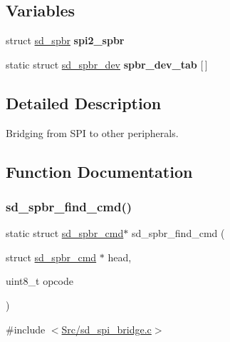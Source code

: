 \subsection*{Variables}
\begin{DoxyCompactItemize}
\item 
\mbox{\label{group___s_d___s_p_i___bridge_gae38f302a3033c610bf39100302e35677}} 
struct \mbox{\hyperlink{structsd__spbr}{sd\+\_\+spbr}} {\bfseries spi2\+\_\+spbr}
\item 
static struct \mbox{\hyperlink{structsd__spbr__dev}{sd\+\_\+spbr\+\_\+dev}} {\bfseries spbr\+\_\+dev\+\_\+tab} \mbox{[}$\,$\mbox{]}
\end{DoxyCompactItemize}


\subsection{Detailed Description}
Bridging from S\+PI to other peripherals. 



\subsection{Function Documentation}
\mbox{\label{group___s_d___s_p_i___bridge_ga2b5f70f500fea4bd4b79b8788ba6e03d}} 
\subsubsection{\texorpdfstring{sd\+\_\+spbr\+\_\+find\+\_\+cmd()}{sd\_spbr\_find\_cmd()}}
{\footnotesize\ttfamily static struct \mbox{\hyperlink{structsd__spbr__cmd}{sd\+\_\+spbr\+\_\+cmd}}$\ast$ sd\+\_\+spbr\+\_\+find\+\_\+cmd (\begin{DoxyParamCaption}\item[{struct \mbox{\hyperlink{structsd__spbr__cmd}{sd\+\_\+spbr\+\_\+cmd}} $\ast$}]{head,  }\item[{uint8\+\_\+t}]{opcode }\end{DoxyParamCaption})\hspace{0.3cm}{\ttfamily [static]}}



{\ttfamily \#include $<$\mbox{\hyperlink{sd__spi__bridge_8c}{Src/sd\+\_\+spi\+\_\+bridge.\+c}}$>$}



